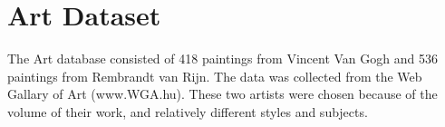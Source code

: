\documentclass[conference,11pt]{IEEEtran}
\begin{document}
\section{Art Dataset}
The Art database consisted of 418 paintings from Vincent Van Gogh and 536 paintings from Rembrandt van Rijn.  The data was collected from the Web Gallary of Art (www.WGA.hu).  These two artists were chosen because of the volume of their work, and relatively different styles and subjects.

\begin{table}[H]
\centering
\caption{Hyperparameters for Art Dataset - Continuous Results}
\end{table}
\end{document}
